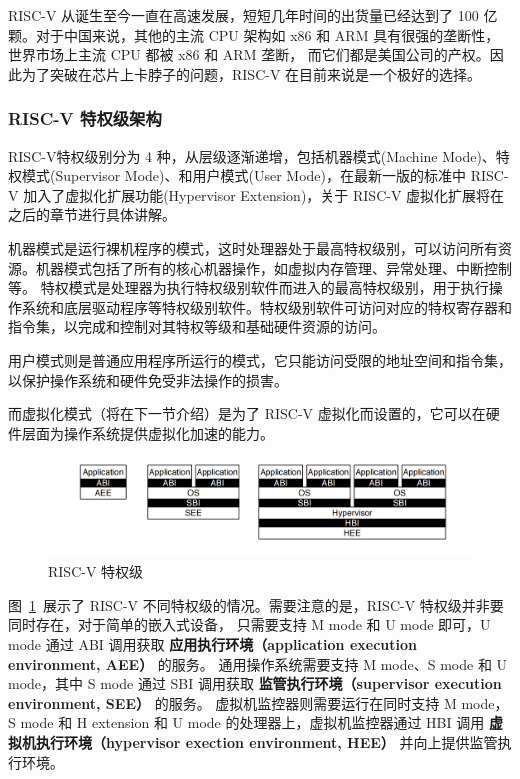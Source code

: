 RISC-V 从诞生至今一直在高速发展，短短几年时间的出货量已经达到了 100 亿颗。对于中国来说，其他的主流 CPU 架构如 x86 和 ARM 具有很强的垄断性，世界市场上主流 CPU 都被 x86 和 ARM 垄断，
而它们都是美国公司的产权。因此为了突破在芯片上卡脖子的问题，RISC-V 在目前来说是一个极好的选择。

\subsubsection{RISC-V 特权级架构}
RISC-V特权级别分为 4 种，从层级逐渐递增，包括机器模式(Machine Mode)、特权模式(Supervisor Mode)、和用户模式(User Mode)，在最新一版的标准中 RISC-V 加入了虚拟化扩展功能(Hypervisor Extension)，关于 RISC-V 虚拟化扩展将在之后的章节进行具体讲解。

机器模式是运行裸机程序的模式，这时处理器处于最高特权级别，可以访问所有资源。机器模式包括了所有的核心机器操作，如虚拟内存管理、异常处理、中断控制等。
特权模式是处理器为执行特权级别软件而进入的最高特权级别，用于执行操作系统和底层驱动程序等特权级别软件。特权级别软件可访问对应的特权寄存器和指令集，以完成和控制对其特权等级和基础硬件资源的访问。

用户模式则是普通应用程序所运行的模式，它只能访问受限的地址空间和指令集，以保护操作系统和硬件免受非法操作的损害。

而虚拟化模式（将在下一节介绍）是为了 RISC-V 虚拟化而设置的，它可以在硬件层面为操作系统提供虚拟化加速的能力。

\begin{figure}[]
    \centering
    \includegraphics[width=1\textwidth]{thesis-images/riscv-privilege.png}
    \caption{RISC-V 特权级\cite{riscv_isa}}\label{fig:riscv-privilege}
\end{figure}

图~\ref{fig:riscv-privilege}~展示了 RISC-V 不同特权级的情况。需要注意的是，RISC-V 特权级并非要同时存在，对于简单的嵌入式设备， 
只需要支持 M mode 和 U mode 即可，U mode 通过 ABI 调用获取 \textbf{应用执行环境（application execution environment, AEE）} 的服务。
通用操作系统需要支持 M mode、S mode 和 U mode，其中 S mode 通过 SBI 调用获取 \textbf{监管执行环境（supervisor execution environment, SEE）} 的服务。
虚拟机监控器则需要运行在同时支持 M mode，S mode 和 H extension 和 U mode 的处理器上，虚拟机监控器通过 HBI 调用 \textbf{虚拟机执行环境（hypervisor exection environment, HEE）} 并向上提供监管执行环境。\cite{riscv_isa}

